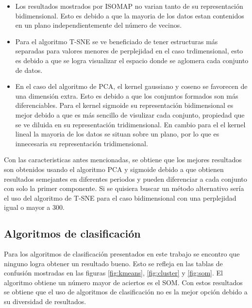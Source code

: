 \begin{itemize}
    \item Los resultados mostrados por ISOMAP no varian tanto de su representación bidimensional. Esto es debido a que la mayoria de los datos estan contenidos en un plano independientemente del número de vecinos.
    \item Para el algoritmo T-SNE se ve beneficiado de tener estructuras más separadas para valores menores de perplejidad en el caso trdimensional, esto es debido a que se logra visualizar el espacio donde se aglomera cada conjunto de datos.
    \item En el caso del algoritmo de PCA, el kernel gaussiano y coseno se favorecen de una dimensión extra. Esto es debido a que los conjuntos formados son más diferenciables. Para el kernel sigmoide su representación bidimensional es mejor debido a que es más sencillo de visulizar cada conjunto, propiedad que se ve diluida en su representación tridimensional. En cambio para el el kernel lineal la mayoria de los datos se situan sobre un plano, por lo que es innecesaria su representación tridimensional.
\end{itemize}

Con las caracteristicas antes mencionadas, se obtiene que los mejores resultados son obtenidos usando el algoritmo PCA y sigmoide debido a que obtienen resultados semejantes en diferentes periodos y pueden diferenciar a cada conjunto con solo la primer componente. Si se quisiera buscar un método alternativo sería el uso del algoritmo de T-SNE para el caso bidimensional con una perplejidad igual o mayor a 300.

\subsection{Algoritmos de clasificación}

Para los algoritmos de clasificación presentados en este trabajo se encontro que ninguno logra obtener un resultado bueno. Esto se refleja en las tablas de confusión mostradas en las figuras \ref{fig:kmeans}, \ref{fig:cluster} y \ref{fig:som}. El algoritmo obtiene un número mayor de aciertos es el SOM. Con estos resultados se obtiene que el uso de algoritmos de clasificación no es la mejor opción debido a su diversidad de resultados.